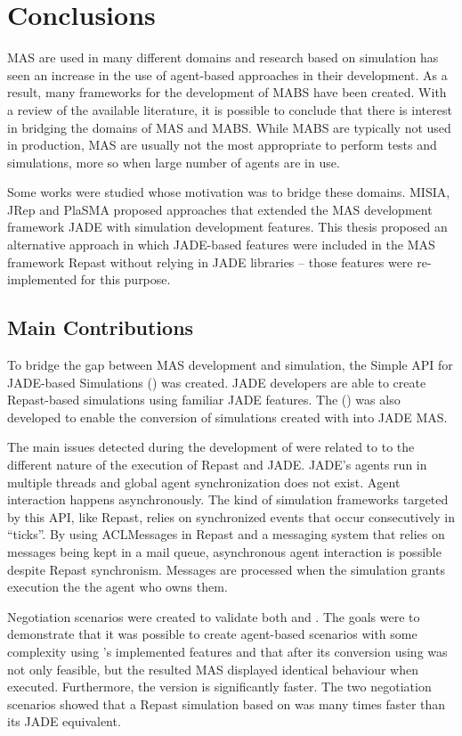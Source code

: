 \chapter{Conclusions}
\label{chap:conclusions}

MAS are used in many different domains and research based on simulation has seen an increase in the use of agent-based approaches in their development. As a result, many frameworks for the development of MABS have been created. With a review of the available literature, it is possible to conclude that there is interest in bridging the domains of MAS and MABS. While MABS are typically not used in production, MAS are usually not the most appropriate to perform tests and simulations, more so when large number of agents are in use.

Some works were studied whose motivation was to bridge these domains. MISIA, JRep and PlaSMA proposed approaches that extended the MAS development framework JADE with simulation development features. This thesis proposed an alternative approach in which JADE-based features were included in the MAS framework Repast without relying in JADE libraries -- those features were re-implemented for this purpose.

\section{Main Contributions}
To bridge the gap between MAS development and simulation, the Simple API for JADE-based Simulations (\apiname) was created. JADE developers are able to create Repast-based simulations using familiar JADE features. The \pluginname (\plugin) was also developed to enable the conversion of simulations created with \apiname into JADE MAS.

The main issues detected during the development of \apiname were related to to the different nature of the execution of Repast and JADE. JADE's agents run in multiple threads and global agent synchronization does not exist. Agent interaction happens asynchronously. The kind of simulation frameworks targeted by this API, like Repast, relies on synchronized events that occur consecutively in ``ticks''. By using ACLMessages in Repast and a messaging system that relies on messages being kept in a mail queue, asynchronous agent interaction is possible despite Repast synchronism. Messages are processed when the simulation grants execution the the agent who owns them.

Negotiation scenarios were created to validate both \apiname and \plugin. The goals were to demonstrate that it was possible to create agent-based scenarios with some complexity using \apiname's implemented features and that after its conversion using \plugin was not only feasible, but the resulted MAS displayed identical behaviour when executed. Furthermore, the \apiname version is significantly faster. The two negotiation scenarios showed that a Repast simulation based on \apiname was many times faster than its JADE equivalent.

